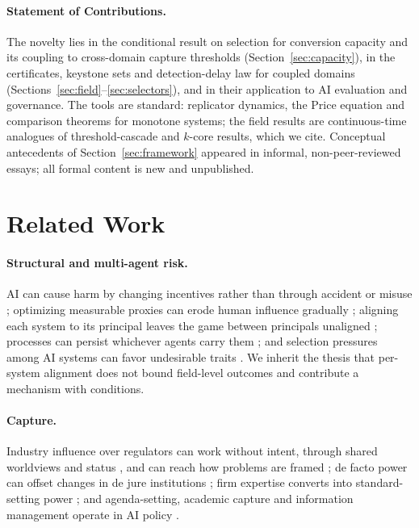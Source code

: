 \documentclass[letterpaper]{article} %
\theoremstyle{definition}
\begin{document}
\paragraph{Statement of Contributions.} The novelty lies in the conditional result on selection for conversion capacity and its coupling to cross-domain capture thresholds (Section~\ref{sec:capacity}), in the certificates, keystone sets and detection-delay law for coupled domains (Sections~\ref{sec:field}--\ref{sec:selectors}), and in their application to AI evaluation and governance. The tools are standard: replicator dynamics, the Price equation and comparison theorems for monotone systems; the field results are continuous-time analogues of threshold-cascade and $k$-core results, which we cite. Conceptual antecedents of Section~\ref{sec:framework} appeared in informal, non-peer-reviewed essays; all formal content is new and unpublished.

\section{Related Work}\label{sec:related}

\paragraph{Structural and multi-agent risk.} AI can cause harm by changing incentives rather than through accident or misuse \citep{zwetsloot2019}; optimizing measurable proxies can erode human influence gradually \citep{christiano2019,kulveit2025,kasirzadeh2025}; aligning each system to its principal leaves the game between principals unaligned \citep{critch2020,critch2023,dafoe2020}; processes can persist whichever agents carry them \citep{critch2021}; and selection pressures among AI systems can favor undesirable traits \citep{hendrycks2023,hammond2025}. We inherit the thesis that per-system alignment does not bound field-level outcomes and contribute a mechanism with conditions.

\paragraph{Capture.} Industry influence over regulators \citep{stigler1971,dalbo2006,carpenter2013} can work without intent, through shared worldviews and status \citep{kwak2014}, and can reach how problems are framed \citep{hanson2003}; de facto power can offset changes in de jure institutions \citep{acemoglu2008}; firm expertise converts into standard-setting power \citep{buthe2011}; and agenda-setting, academic capture and information management operate in AI policy \citep{wei2024,abdalla2021,whittaker2021,ahmed2023}.
\end{document}
